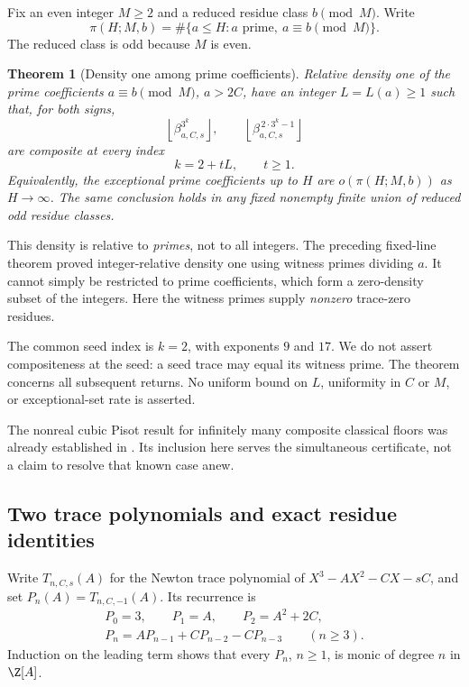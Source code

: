 \documentclass[11pt,a4paper]{article}
\newtheorem{theorem}{Theorem}[section]
\theoremstyle{definition}\newtheorem{definition}[theorem]{Definition}
\theoremstyle{remark}\newtheorem{remark}[theorem]{Remark}
\newcommand{\floor}[1]{\left\lfloor#1\right\rfloor}
\begin{document}
Fix an even integer $M\ge2$ and a reduced residue class $b\pmod M$.
Write
\[
 \pi(H;M,b)=\#\{a\le H:a\text{ prime},\ a\equiv b\pmod M\}.
\]
The reduced class is odd because $M$ is even.

\begin{theorem}[Density one among prime coefficients]\label{R10:thm:main}
Relative density one of the prime coefficients $a\equiv b\pmod M$,
$a>2C$, have an integer $L=L(a)\ge1$ such that, for both signs,
\[
 \floor{\beta_{a,C,s}^{3^k}},\qquad
 \floor{\beta_{a,C,s}^{\,2\cdot3^k-1}}
\]
are composite at every index
\[
                         k=2+tL,\qquad t\ge1.
\]
Equivalently, the exceptional prime coefficients up to $H$ are
$o(\pi(H;M,b))$ as $H\to\infty$.
The same conclusion holds in any fixed nonempty finite union of reduced
odd residue classes.
\end{theorem}

This density is relative to \emph{primes}, not to all integers.
The preceding fixed-line theorem \cite{R08} proved integer-relative
density one using witness primes dividing $a$.
It cannot simply be restricted to prime coefficients, which form a
zero-density subset of the integers.
Here the witness primes supply \emph{nonzero} trace-zero residues.

The common seed index is $k=2$, with exponents $9$ and $17$.
We do not assert compositeness at the seed: a seed trace may equal its
witness prime. The theorem concerns all subsequent returns.
No uniform bound on $L$, uniformity in $C$ or $M$, or exceptional-set
rate is asserted.

The nonreal cubic Pisot result for infinitely many composite classical
floors was already established in \cite[theorem
\emph{Nonreal cubic conjugates}]{K031}.
Its inclusion here serves the simultaneous certificate, not a claim
to resolve that known case anew.

\subsection{Two trace polynomials and exact residue identities}

Write $T_{n,C,s}(A)$ for the Newton trace polynomial of
$X^3-AX^2-CX-sC$, and set $P_n(A)=T_{n,C,-1}(A)$.
Its recurrence is
\begin{equation}\label{R10:eq:recurrence}
 \begin{gathered}
 P_0=3,\qquad P_1=A,\qquad P_2=A^2+2C,\\
 P_n=AP_{n-1}+CP_{n-2}-CP_{n-3}\qquad(n\ge3).
 \end{gathered}
\end{equation}
Induction on the leading term shows that every $P_n$, $n\ge1$,
is monic of degree $n$ in $\Z[A]$.
\end{document}
